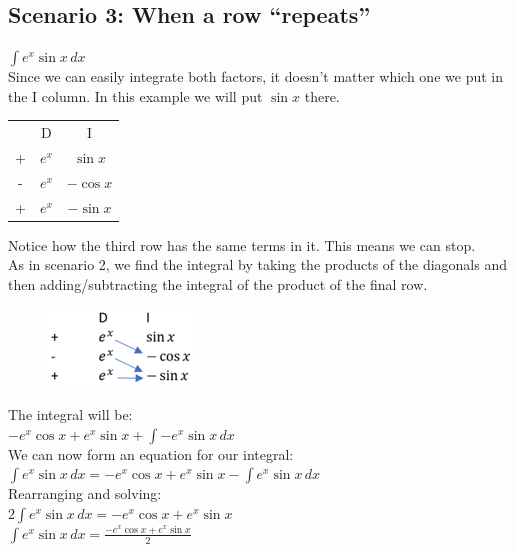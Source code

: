 \documentclass[../main.tex]{subfiles}
\begin{document}
\subsection*{Scenario 3: When a row “repeats”}
\(\int e^x \sin{x}\,dx\)\\
Since we can easily integrate both factors, it doesn’t matter which one we put in the I column. In this example we will put \(\sin{x}\) there.\\

\begin{tabular}{ c c c }
   & D & I \\ 
 +  & $e^x$ &$\sin{x}$ \\  
 - & $e^x$ & $-\cos{x}$\\
  + & $e^x$ & $-\sin{x}$ \\  
\end{tabular}

Notice how the third row has the same terms in it. This means we can stop.\\

As in scenario 2, we find the integral by taking the products of the diagonals and then adding/subtracting the integral of the product of the final row.\\

\begin{figure}[h]
    \includegraphics{images/dimethod3.png}
\end{figure}

The integral will be:\\
\(-e^x\cos{x}+e^x\sin{x}+\int -e^x\sin{x}\,dx\)\\

We can now form an equation for our integral:\\
\(\int e^x \sin{x}\,dx=-e^x\cos{x}+e^x\sin{x}-\int e^x\sin{x}\,dx\)\\

Rearranging and solving:\\
\(2\int e^x \sin{x}\,dx=-e^x\cos{x}+e^x\sin{x}\)\\
\(\int e^x \sin{x}\, dx=\frac{-e^x\cos{x}+e^x\sin{x}}{2}\)\\

\pagebreak
\end{document}
